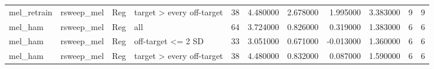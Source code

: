 \begin{table}
\begin{tabular}{llllrrrrrrr}
mel\_retrain & rsweep\_mel & Reg & target > every off-target & 38 & 4.480000 & 2.678000 & 1.995000 & 3.383000 & 9 & 9 \\
mel\_ham & rsweep\_mel & Reg & all & 64 & 3.724000 & 0.826000 & 0.319000 & 1.383000 & 6 & 6 \\
mel\_ham & rsweep\_mel & Reg & off-target <= 2 SD & 33 & 3.051000 & 0.671000 & -0.013000 & 1.360000 & 6 & 6 \\
mel\_ham & rsweep\_mel & Reg & target > every off-target & 38 & 4.480000 & 0.832000 & 0.087000 & 1.590000 & 6 & 6 \\
\bottomrule
\end{tabular}
\end{table}
